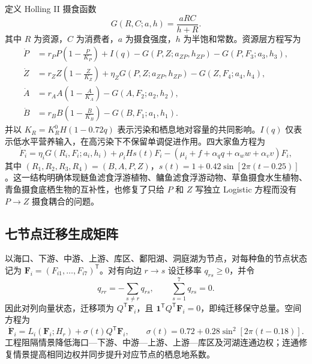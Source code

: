 \documentclass[withoutpreface,bwprint]{cumcmthesis}
\begin{document}
定义 Holling II 摄食函数\cite{holling1959}
\begin{equation}
G(R,C;a,h)=\frac{aRC}{h+R}.\label{eq:holling}
\end{equation}
其中 $R$ 为资源，$C$ 为消费者，$a$ 为摄食强度，$h$ 为半饱和常数。资源层方程写为
\begin{align}
\dot P&=r_P P\left(1-\frac{P}{K_P}\right)+I(q)-G(P,Z;a_{ZP},h_{ZP})-G(P,F_3;a_3,h_3),\label{eq:P}\\
\dot Z&=r_Z Z\left(1-\frac{Z}{K_Z}\right)+\eta_ZG(P,Z;a_{ZP},h_{ZP})-G(Z,F_4;a_4,h_4),\label{eq:Z}\\
\dot A&=r_A A\left(1-\frac{A}{K_A}\right)-G(A,F_2;a_2,h_2),\label{eq:A}\\
\dot B&=r_B B\left(1-\frac{B}{K_B}\right)-G(B,F_1;a_1,h_1).\label{eq:B}
\end{align}
并以 $K_R=K_R^0H(1-0.72q)$ 表示污染和栖息地对容量的共同影响。$I(q)$ 仅表示低水平营养输入，在高污染下不保留单调促进作用。四大家鱼方程为
\begin{equation}
\dot F_i=\eta_iG(R_i,F_i;a_i,h_i)+\rho_iHs(t)F_i-
(\mu_i+f+\alpha_q q+\alpha_w w+\alpha_v v)F_i,\label{eq:fish}
\end{equation}
其中 $(R_1,R_2,R_3,R_4)=(B,A,P,Z)$，$s(t)=1+0.42\sin[2\pi(t-0.25)]$。这一结构明确体现鲢鱼滤食浮游植物、鳙鱼滤食浮游动物、草鱼摄食水生植物、青鱼摄食底栖生物的互补性，也修复了只给 $P$ 和 $Z$ 写独立 Logistic 方程而没有 $P\to Z$ 摄食耦合的问题。\AIassistmark

\subsection{七节点迁移生成矩阵}

以海口、下游、中游、上游、库区、鄱阳湖、洞庭湖为节点，对每种鱼的节点状态记为
$\boldsymbol F_i=(F_{i1},\ldots,F_{i7})^{\mathsf T}$。对有向边 $r\to s$ 设迁移率 $q_{rs}\ge 0$，并令
\begin{equation}
q_{rr}=-\sum_{s\ne r}q_{rs},\qquad \sum_{s=1}^{7}q_{rs}=0.\label{eq:generator}
\end{equation}
因此对列向量状态，迁移项为 $Q^{\mathsf T}\boldsymbol F_i$，且
$\boldsymbol 1^{\mathsf T}Q^{\mathsf T}\boldsymbol F_i=0$，即纯迁移保守总量。空间方程为
\begin{equation}
\dot{\boldsymbol F}_i=L_i(\boldsymbol F_i;H_r)+\sigma(t)Q^{\mathsf T}\boldsymbol F_i,
\qquad
\sigma(t)=0.72+0.28\sin^2[2\pi(t-0.18)].\label{eq:spatial}
\end{equation}
工程阻隔情景降低海口—下游、中游—上游、上游—库区及河湖连通边权；连通修复情景提高相同边权并同步提升对应节点的栖息地系数。
\end{document}
